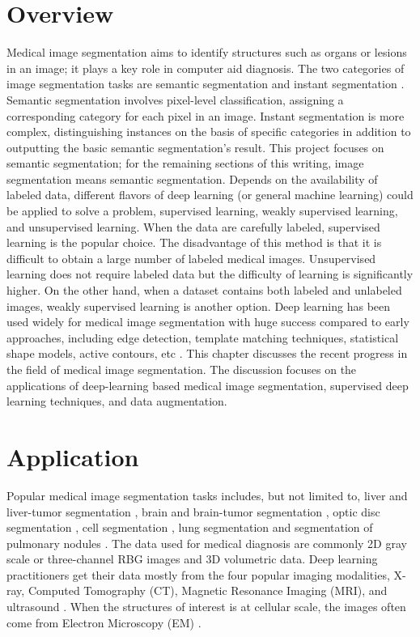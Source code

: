 \documentclass [11pt, proquest] {uwthesis}[2020/02/24]
\begin{document}
\section{Overview}
Medical image segmentation aims to identify structures such as organs or lesions in 
an image; it plays a key role in computer aid diagnosis. The two categories of image 
segmentation tasks are semantic segmentation and instant segmentation \cite{lei_medical_2020}. 
Semantic segmentation involves pixel-level classification, assigning a corresponding category 
for each pixel in an image. Instant segmentation is more complex, distinguishing instances 
on the basis of specific categories in addition to outputting the basic semantic segmentation’s 
result. This project focuses on semantic segmentation; for the remaining sections of 
this writing, image segmentation means semantic segmentation. Depends on the availability 
of labeled data, different flavors of deep learning (or general machine learning) 
could be applied to solve a problem, supervised learning, weakly supervised learning, 
and unsupervised learning. When the data are carefully labeled, supervised learning 
is the popular choice. The disadvantage of this method is that it is difficult to obtain 
a large number of labeled medical images. Unsupervised learning does not require labeled 
data but the difficulty of learning is significantly higher. On the other hand, when a 
dataset contains both labeled and unlabeled images, weakly supervised learning is another 
option. Deep learning has been used widely for medical image segmentation with 
huge success compared to early approaches, including edge detection, template matching 
techniques, statistical shape models, active contours, etc \cite{lei_medical_2020}. 
This chapter discusses the recent progress in the field of medical image segmentation. 
The discussion focuses on the applications of deep-learning based medical image segmentation, 
supervised deep learning techniques, and data augmentation.

\section{Application}

Popular medical image segmentation tasks includes, but not limited to, liver 
and liver-tumor segmentation \cite{ li_automatic_2015, vivanti_automatic_nodate}, 
brain and brain-tumor segmentation \cite{menze_multimodal_2015, cherukuri_learning_2018}, 
optic disc segmentation \cite{ cheng_superpixel_2013, fu_joint_2018}, cell 
segmentation \cite{navab_u-net_2015, song_dual-channel_2017}, lung segmentation 
and segmentation of pulmonary nodules \cite{ wang_central_2017, onishi_multiplanar_2019}. 
The data used for medical diagnosis are commonly 2D gray scale or three-channel RBG images 
and 3D volumetric data. Deep learning practitioners get their data mostly from the four popular 
imaging modalities, X-ray, Computed Tomography (CT), Magnetic Resonance Imaging (MRI), and 
ultrasound \cite{lei_medical_2020}. When the structures of interest is at cellular scale, 
the images often come from Electron Microscopy (EM) \cite{navab_u-net_2015}.
\end{document}
